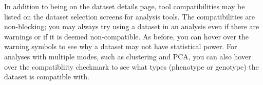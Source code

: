 \documentclass[
  12pt,
]{book}
\begin{document}
In addition to being on the dataset details page, tool compatibilities may be listed on the dataset selection screens for analysis tools. The compatibilities are non-blocking; you may always try using a dataset in an analysis even if there are warnings or if it is deemed non-compatible. As before, you can hover over the warning symbols to see why a dataset may not have statistical power. For analyses with multiple modes, such as clustering and PCA, you can also hover over the compatibliity checkmark to see what types (phenotype or genotype) the dataset is compatible with.
\end{document}
